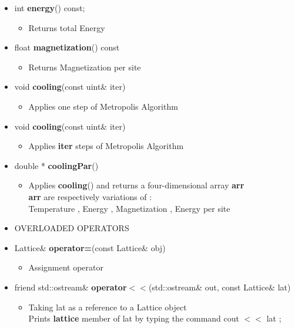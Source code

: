 \begin{itemize}
\begin{itemize}
			\item[] int \textbf{energy}() const;		 
			\begin{itemize}
				\item[] Returns total Energy 
			\end{itemize} 
			
			\item[] float \textbf{magnetization}() const		 
			\begin{itemize}
				\item[] Returns Magnetization per site  
				
			\end{itemize}
			
			\item[] void \textbf{cooling}(const uint\& iter) 		 
			\begin{itemize}
				\item[] Applies one step of Metropolis Algorithm 
			\end{itemize}
			
			
			\item[] void \textbf{cooling}(const uint\& iter) 		 
			\begin{itemize}
				\item[] Applies \textbf{iter} steps of Metropolis Algorithm
			\end{itemize}
			
			\item[] double * \textbf{coolingPar}()	 
			\begin{itemize}
				\item[] Applies \textbf{cooling}() and returns a four-dimensional array \textbf{arr} \\
						\textbf{arr} are respectively variations of : \\
						Temperature , Energy , Magnetization , Energy per site  \\
			\end{itemize}
		
		\item[] 
		OVERLOADED OPERATORS \\

			\item[] Lattice\& \textbf{operator=}(const Lattice\& obj)		 
			\begin{itemize}
				\item[] Assignment operator \\
			\end{itemize}
			
			\item[] friend std::ostream\& \textbf{operator$<<$}(std::ostream\& out, const Lattice\& lat) 	
			\begin{itemize}
				\item[] Taking \textsf{lat} as a reference to a Lattice object \\
				Prints \textbf{lattice} member of \textsf{lat} by typing the command \textsf{cout $<<$ lat ;} 
			\end{itemize}	
			

\end{itemize}
\end{itemize}

